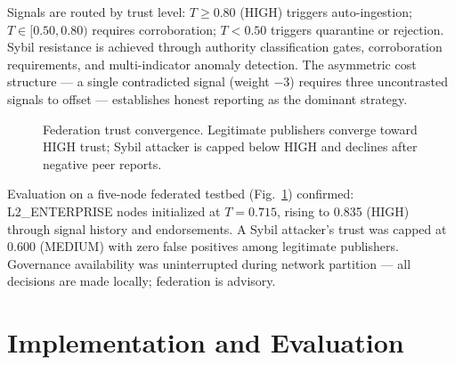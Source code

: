 \documentclass[journal]{IEEEtran}
\begin{document}
Signals are routed by trust level: $T \geq 0.80$ (HIGH) triggers auto-ingestion; $T \in [0.50, 0.80)$ requires corroboration; $T < 0.50$ triggers quarantine or rejection. Sybil resistance is achieved through authority classification gates, corroboration requirements, and multi-indicator anomaly detection. The asymmetric cost structure --- a single contradicted signal (weight $-3$) requires three uncontrasted signals to offset --- establishes honest reporting as the dominant strategy.

\begin{figure}[t]
\centering
{}
\caption{Federation trust convergence. Legitimate publishers converge toward HIGH trust; Sybil attacker is capped below HIGH and declines after negative peer reports.}
\label{fig:trust}
\end{figure}

Evaluation on a five-node federated testbed (Fig.~\ref{fig:trust}) confirmed: L2\_ENTERPRISE nodes initialized at $T = 0.715$, rising to 0.835 (HIGH) through signal history and endorsements. A Sybil attacker's trust was capped at 0.600 (MEDIUM) with zero false positives among legitimate publishers. Governance availability was uninterrupted during network partition --- all decisions are made locally; federation is advisory.

\section{Implementation and Evaluation}
\end{document}

